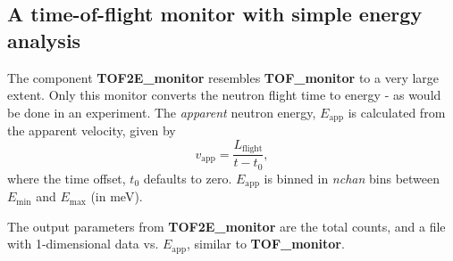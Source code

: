 \subsection*{A time-of-flight monitor with simple energy analysis} \label{s:TOF2E_monitor}

The component \textbf{TOF2E\_monitor} resembles \textbf{TOF\_monitor}
to a very large extent. Only this monitor converts the neutron flight
time to energy - as would be done in an experiment.
The {\em apparent} neutron energy, $E_\textrm{app}$ is calculated 
from the apparent velocity, given by 
\begin{equation}
v_\textrm{app} = \frac{L_\textrm{flight}}{t-t_0} ,
\end{equation}
where the time offset, $t_0$ defaults to zero.
$E_\textrm{app}$ is binned in \textit{nchan} bins between
$E_\textrm{min}$ and $E_\textrm{max}$ (in meV).

The output parameters from \textbf{TOF2E\_monitor} are the total counts,
and a file with 1-dimensional data vs. $E_\textrm{app}$, 
similar to \textbf{TOF\_monitor}.

